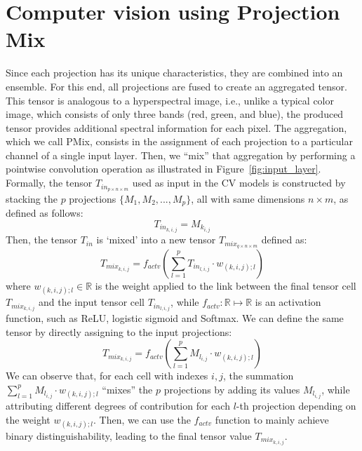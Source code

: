 

\section{Computer vision using Projection Mix}

Since each projection has its unique characteristics, they are combined into an ensemble. For this end, all projections are fused to create an aggregated tensor. This tensor is analogous to a hyperspectral image, i.e., unlike a typical color image, which consists of only three bands (red, green, and blue), the produced tensor provides additional spectral information for each pixel. The aggregation, which we call \gls{PMix}, consists in the assignment of each projection to a particular channel of a single input layer. Then, we ``mix'' that aggregation by performing a pointwise convolution operation as illustrated in Figure~\ref{fig:input_layer}. Formally, the tensor $T_{in_{p \times n \times m}}$ used as input in the \gls{CV} models is constructed by stacking the $p$ projections $\{M_1, M_2, ..., M_p\}$, all with same dimensions $n \times m$, as defined as follows:
\begin{equation}
    T_{in_{k,i,j}} = M_{k_{i,j}}
\end{equation}
\noindent Then, the tensor $T_{in}$ is `mixed' into a new tensor $T_{mix_{q \times n \times m}}$ defined as:
\begin{equation}
    T_{mix_{k,i,j}} = f_{actv}\left(\sum\limits_{l=1}^{p}T_{in_{l,i,j}} \cdot w_{(k,i,j);l}\right)
\end{equation} 
\noindent where $w_{(k,i,j);l} \in \mathbb{R}$ is the weight applied to the link between the final tensor cell $T_{mix_{k,i,j}}$ and the input tensor cell $T_{in_{l,i,j}}$, while $f_{actv}: \mathbb{R} \mapsto \mathbb{R}$ is an activation function, such as ReLU, logistic sigmoid and Softmax. We can define the same tensor by directly assigning to the input projections:
\begin{equation}
    \label{eq:mix}
    T_{mix_{k,i,j}} = f_{actv}\left(\sum\limits_{l=1}^{p}M_{l_{i,j}} \cdot w_{(k,i,j);l}\right)
\end{equation}
\noindent We can observe that, for each cell with indexes $i,j$, the summation $\sum\limits_{l=1}^{p}M_{l_{i,j}} \cdot w_{(k,i,j);l}$ ``mixes'' the $p$ projections by adding its values $M_{l_{i,j}}$, while attributing different degrees of contribution for each $l$-th projection depending on the weight $w_{(k,i,j);l}$. Then, we can use the $f_{actv}$ function to mainly achieve binary distinguishability, leading to the final tensor value $T_{mix_{k,i,j}}$. 


